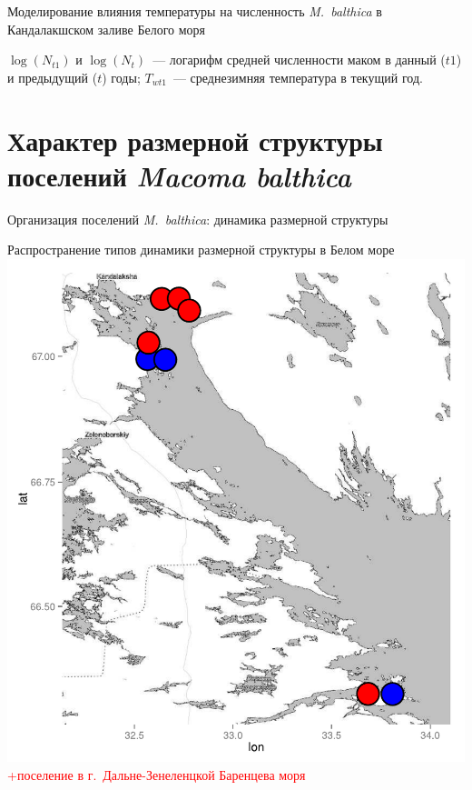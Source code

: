 \documentclass{beamer}
\begin{document}
\begin{frame}{Моделирование влияния температуры на численность {\it M.~balthica} в Кандалакшском заливе Белого моря}
\begin{minipage}[t]{.49\linewidth}
\begin{center}
		\end{center}
	\end{minipage}
{\tiny $\log(N_{t1})$ и $\log(N_{t})$~--- логарифм средней численности маком в данный ($t1$) и предыдущий ($t$) годы; $T_{wt1}$~--- среднезимняя температура в текущий год.}
\end{frame}

		\section[Размерная структура]{Характер размерной структуры поселений {\it Macoma balthica}}

\begin{frame}{Организация поселений {\it M.~balthica}: динамика размерной структуры}
	\begin{minipage}[t]{.53\linewidth}
		\begin{center}
			{\scriptsize Распространение типов динамики размерной структуры в Белом море}\\
			\includegraphics[width=\textwidth]{map_size_distr.pdf}\\
\textcolor{red}{\scriptsize +поселение в г.~Дальне-Зенеленцкой Баренцева моря}
		\end{center}


\end{minipage}
\end{frame}
\end{document}
